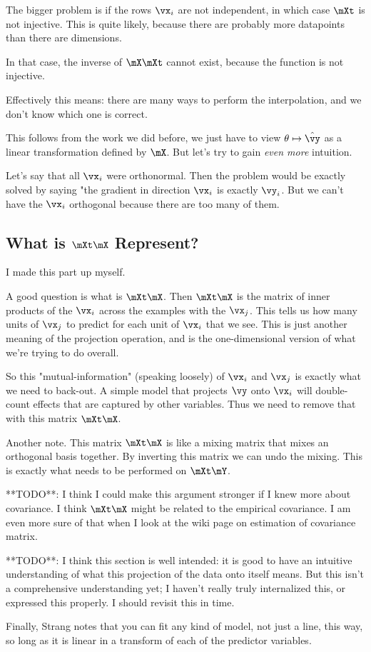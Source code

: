 The bigger problem is if the rows $\vx_i$ are not independent, in which
case $\mXt$ is not injective. This is quite likely, because there
are probably more datapoints than there are dimensions.

In that case, the inverse of $\mX \mXt$ cannot exist, because the
function is not injective.

Effectively this means: there are many ways to perform the
interpolation, and we don't know which one is correct.

This follows from the work we did before, we just have to view $\theta
\mapsto \hat{\vy}$ as a linear transformation defined by $\mX$. But
let's try to gain \emph{even more} intuition.

Let's say that all $\vx_i$ were orthonormal. Then the problem would be
exactly solved by saying "the gradient in direction $\vx_i$ is exactly
$\vy_i$. But we can't have the $\vx_i$ orthogonal because there are too
many of them.

\subsection{What is \texorpdfstring{$\mXt \mX$}{XtX} Represent?}

I made this part up myself.

A good question is what is $\mXt \mX$. Then $\mXt \mX$ is the matrix of
inner products of the $\vx_i$ across the examples with the $\vx_j$. This
tells us how many units of $\vx_j$ to predict for each unit of $\vx_i$
that we see. This is just another meaning of the projection operation,
and is the one-dimensional version of what we're trying to do overall.

So this "mutual-information" (speaking loosely) of $\vx_i$ and $\vx_j$
is exactly what we need to back-out. A simple model that projects $\vy$
onto $\vx_i$ will double-count effects that are captured by other
variables. Thus we need to remove that with this matrix $\mXt \mX$.

Another note. This matrix $\mXt \mX$ is like a mixing matrix that mixes
an orthogonal basis together. By inverting this matrix we can undo the
mixing. This is exactly what needs to be performed on $\mXt \mY$.

**TODO**: I think I could make this argument stronger if I knew more
about covariance. I think $\mXt \mX$ might be related to the empirical
covariance. I am even more sure of that when I look at the wiki page on
estimation of covariance matrix.

**TODO**: I think this section is well intended: it is good to have an
intuitive understanding of what this projection of the data onto
itself means. But this isn't a comprehensive understanding yet; I
haven't really truly internalized this, or expressed this properly. I
should revisit this in time.

Finally, Strang notes that you can fit any kind of model, not just a
line, this way, so long as it is linear in a transform of each of the
predictor variables.
